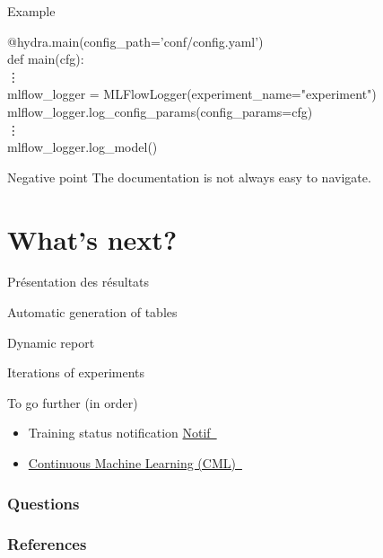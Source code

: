 \documentclass[aspectratio=169,10pt,xcolor=x11names,english,french]{beamer}
\makeatletter
\newenvironment{Scode}{%
	\def\FrameCommand##1{\hskip\@totalleftmargin
		\vrule width 3pt\colorbox{codebg}{\hspace{5pt}##1}%
		\hskip-\linewidth \hskip-\@totalleftmargin \hskip\columnwidth}%
	\MakeFramed {\advance\hsize-\width
		\@totalleftmargin\z@ \linewidth\hsize
		\advance\labelsep\fboxsep
		\@setminipage}%
}{\par\unskip\@minipagefalse\endMakeFramed}
\newcommand{\link}[2]{\href{#1}{#2~{\smaller\faExternalLink*}}}
\makeatother
\begin{document}
	\begin{frame}{Example}
		\begin{Scode}
			@hydra.main(config\_path='conf/config.yaml') \\
			def main(cfg): \\
			\quad \vdots \\
			\quad mlflow\_logger = MLFlowLogger(experiment\_name="experiment") \\
			\quad mlflow\_logger.log\_config\_params(config\_params=cfg) \\
			\quad \vdots \\
			\quad mlflow\_logger.log\_model()\\
		\end{Scode}
	\end{frame}

	\begin{frame}{Negative point}
		The documentation is not always easy to navigate.
	\end{frame}

		
	\section{What's next?}
	\begin{frame}{Présentation des résultats}
				\centering
		\begin{minipage}{0.49\linewidth}
				\centering
				\fontsize{35}{35}\faTable\vfil
				\vspace{1em}
				\normalsize Automatic generation of tables
		\end{minipage}
		\begin{minipage}{0.49\linewidth}
				\centering
				\fontsize{35}{35}\vfil
				\vspace{1em}
				\normalsize Dynamic report
		\end{minipage}
	\end{frame}
	\begin{frame}
		\centering
		\fontsize{35}{35}\faRefresh\vfil
		\vspace{1em}
		\normalsize Iterations of experiments
	\end{frame}
	
	\begin{frame}{To go further (in order)}
		\begin{itemize}
			\item Training status notification \link{https://notificationdoc.ca/}{Notif}
			\item \link{https://cml.dev/}{Continuous Machine Learning (CML)} 
		\end{itemize}
	\end{frame}
	
	\begin{frame}
		\frametitle{Questions}
		
		\centering
		\fontsize{100}{100}
		\faQuestion
		
	\end{frame}

	
	
	\begin{frame}[t, allowframebreaks]
		\frametitle{References}
		
		
	\end{frame}
	
	
	
\end{document}
